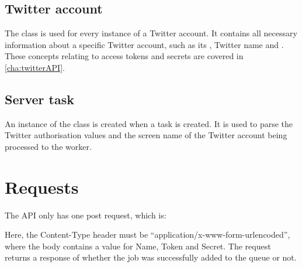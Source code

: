 \subsection{Twitter account}
The class  is used for every instance of a Twitter account. It
contains all necessary information about a specific Twitter account, such as its
, Twitter name and . These
concepts relating to access tokens and secrets are covered in
\autoref{cha:twitterAPI}.

\subsection{Server task}
An instance of the class  is created when a task is created.
It is used to parse the Twitter authorisation values and the screen name of the
Twitter account being processed to the worker.

\section{Requests}
The \ac{API} only has one post request, which is: \nl

\nl

Here, the Content-Type header must be ``application/x-www-form-urlencoded'',
where the body contains a value for Name, Token and Secret.
The request returns a response of whether the job was successfully added to the
queue or not.


